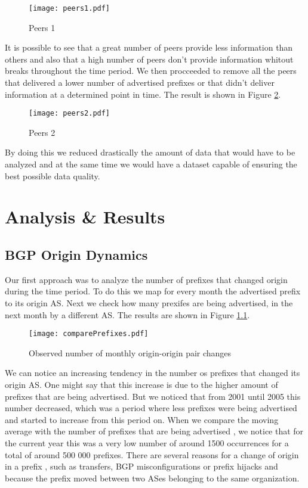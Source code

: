 \documentclass[11pt,a4paper]{scrreprt}
\begin{document}
\begin{figure}[!h]
\centering
\texttt{[image: peers1.pdf]}
\caption{Peers 1}
\label{fig:peers1}
\end{figure}

It is possible to see that a great number of peers provide less information than others and also that a high number of peers don't provide information whitout breaks throughout the time period. We then procceeded to remove all the peers that delivered a lower number of advertised prefixes or that didn't deliver information at a determined point in time. The result is shown in Figure \ref{fig:peers2}.  

\begin{figure}[!h]
\centering
\texttt{[image: peers2.pdf]}
\caption{Peers 2}
\label{fig:peers2}
\end{figure}

By doing this we reduced drastically the amount of data that would have to be analyzed and at the same time we would have a dataset capable of ensuring the best possible data quality. 

\chapter{Analysis \& Results}


\section{BGP Origin Dynamics}

Our first approach was to analyze the number of prefixes that changed origin during the time period. To do this we map for every month the advertised prefix to its origin AS. Next we check how many prexifes are being advertised, in the next month by a different AS. The results are shown in Figure \ref{fig:comparePrefixes}.

\begin{figure}[!h]
\centering
\texttt{[image: comparePrefixes.pdf]}
\caption{Observed number of monthly
origin-origin pair changes}
\label{fig:comparePrefixes}
\end{figure}

We can notice an increasing tendency in the number os prefixes that changed its origin AS. One might say that this increase is due to the higher amount of prefixes that are being advertised. But we noticed that from 2001 until 2005 this number decreased, which was a period where less prefixes were being advertised and started to increase from this period on. When we compare the moving average with the number of prefixes that are being advertised \cite{Potaroo}, we notice that for the current year this was a very low number of around 1500 occurrences for a total of around 500 000 prefixes. There are several reasons for a change of origin in a prefix \cite{IPv4_Transfer_Markets}, such as transfers, BGP misconfigurations or prefix hijacks and because the prefix moved between two ASes belonging to the same organization.     
\end{document}
